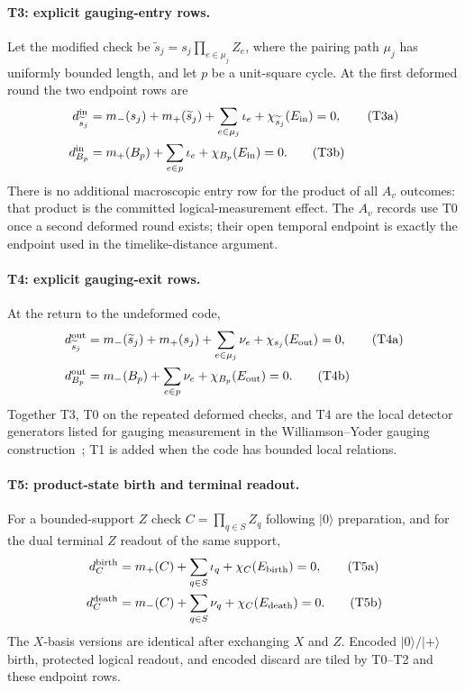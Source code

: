 \documentclass[aps,prx,reprint,superscriptaddress,nofootinbib,floatfix,longbibliography]{revtex4-2}
\theoremstyle{definition}
\begin{document}
\paragraph{T3: explicit gauging-entry rows.}
Let the modified check be
$\widetilde s_j=s_j\prod_{e\in\mu_j}Z_e$, where the pairing path $\mu_j$ has
uniformly bounded length, and let $p$ be a unit-square cycle.  At the first
deformed round the two endpoint rows are
\begin{align}
 d_{\widetilde s_j}^{\rm in}
 &=m_-(s_j)+m_+(\widetilde s_j)
   +\sum_{e\in\mu_j}\iota_e+\chi_{\widetilde s_j}(E_{\rm in})=0,
 \tag{T3a}\\
 d_{B_p}^{\rm in}
 &=m_+(B_p)+\sum_{e\in p}\iota_e+\chi_{B_p}(E_{\rm in})=0.
 \tag{T3b}
\end{align}
There is no additional macroscopic entry row for the product of all $A_v$
outcomes: that product is the committed logical-measurement effect.  The
$A_v$ records use T0 once a second deformed round exists; their open temporal
endpoint is exactly the endpoint used in the timelike-distance argument.

\paragraph{T4: explicit gauging-exit rows.}
At the return to the undeformed code,
\begin{align}
 d_{\widetilde s_j}^{\rm out}
 &=m_-(\widetilde s_j)+m_+(s_j)
   +\sum_{e\in\mu_j}\nu_e+\chi_{s_j}(E_{\rm out})=0,
 \tag{T4a}\\
 d_{B_p}^{\rm out}
 &=m_-(B_p)+\sum_{e\in p}\nu_e+\chi_{B_p}(E_{\rm out})=0.
 \tag{T4b}
\end{align}
Together T3, T0 on the repeated deformed checks, and T4 are the local detector
generators listed for gauging measurement in the Williamson--Yoder gauging construction~\cite{WilliamsonYoderGauging};
T1 is added when the code has bounded local relations.

\paragraph{T5: product-state birth and terminal readout.}
For a bounded-support $Z$ check $C=\prod_{q\in S}Z_q$ following $|0\rangle$
preparation, and for the dual terminal $Z$ readout of the same support,
\begin{align}
 d_C^{\rm birth}&=m_+(C)+\sum_{q\in S}\iota_q+\chi_C(E_{\rm birth})=0,
 \tag{T5a}\\
 d_C^{\rm death}&=m_-(C)+\sum_{q\in S}\nu_q+\chi_C(E_{\rm death})=0.
 \tag{T5b}
\end{align}
The $X$-basis versions are identical after exchanging $X$ and $Z$.  Encoded
$|0\rangle/|+\rangle$ birth, protected logical readout, and encoded discard
are tiled by T0--T2 and these endpoint rows.
\end{document}
